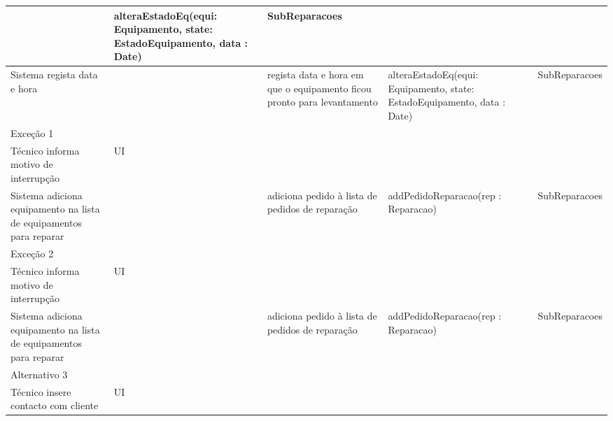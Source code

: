 \documentclass[../relatorio.tex]{subfiles}
\begin{document}
\begin{landscape}
\begin{table}[!h]
\begin{tabular}{|p{5cm}|p{1cm}|p{4cm}|p{6cm}|p{3cm}|}
                     & alteraEstadoEq(equi: Equipamento, state: EstadoEquipamento, data : Date)
                     & SubReparacoes
            \\
            \hline
            Sistema regista data e hora
                     & 
                     & regista data e hora em que o equipamento ficou pronto para levantamento
                     & alteraEstadoEq(equi: Equipamento, state: EstadoEquipamento, data : Date)
                     & SubReparacoes
            \\
            \hline
            \rowcolor{red!30}
            Exceção 1 &                                                  &                  &     &            \\
            \hline
            \rowcolor{yellow}
            Técnico informa motivo de interrupção
                     & UI
                     & 
                     & 
                     & 
            \\
            \hline
            Sistema adiciona equipamento na lista de equipamentos para reparar
                     & 
                     & adiciona pedido à lista de pedidos de reparação 
                     & addPedidoReparacao(rep : Reparacao)
                     & SubReparacoes
            \\
            \hline
            \rowcolor{red!30}
            Exceção 2 &                                                  &                  &     &            \\
            \hline
            \rowcolor{yellow}
            Técnico informa motivo de interrupção
                     & UI
                     & 
                     & 
                     & 
            \\
            \hline
            Sistema adiciona equipamento na lista de equipamentos para reparar
                     & 
                     & adiciona pedido à lista de pedidos de reparação 
                     & addPedidoReparacao(rep : Reparacao) %
                     & SubReparacoes
            \\
            \hline
            \rowcolor{red!30}
            Alternativo 3 &                                                  &                  &     &            \\
            \hline
            \rowcolor{yellow}
            Técnico insere contacto com cliente
                     & UI
                     & 
                     & 
                     & 

\end{tabular}
\end{table}
\end{landscape}
\end{document}
